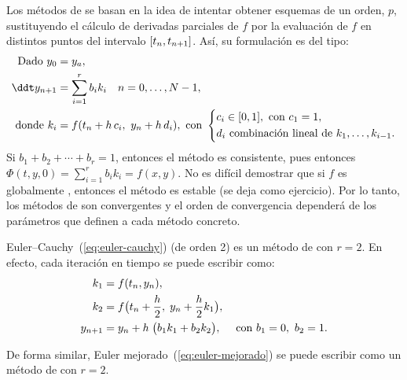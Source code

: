Los métodos de \RK se basan en la idea de intentar obtener
esquemas de un orden, $p$, sustituyendo el cálculo de derivadas
parciales de $f$ por la evaluación de $f$ en distintos puntos del
intervalo $[{t_n},{t_{n+1}}]$. Así, su formulación es del tipo:
\begin{align}
  \notag
  \text{Dado}\ y_0 &= \ycero,\\
  \label{eq:R-K-formula-general}
  \ddt y_{n+1} &= \sum_{i=1}^r b_ik_i\quad
                 n=0,\dots, N-1,
  \\
  \notag
  \text{donde}\ k_i &= f(t_n+h\, c_i,\ y_n + h\, d_{i}), \text{\
                      con }
                      \left\{
                      \begin{aligned}
                        & c_i\in [0,1], \text{ con } c_1=1,
                        \\ &d_{i} \text{ combinación
                          lineal de } k_1,\dots,k_{i-1}.
                      \end{aligned}
                             \right.
\end{align}
Si $b_1+b_2+\cdots+b_r=1$, entonces el método es consistente, pues
entonces $\Phi(t,y,0)=\sum_{i=1}^r b_ik_i=f(x,y)$. No es difícil
demostrar que si $f$ es globalmente \lipschitz, entonces el método es
estable (se deja como ejercicio). Por lo tanto, los métodos de
\RK son convergentes y el orden de convergencia dependerá de
los parámetros que definen a cada método concreto.

\begin{example}
  Euler--Cauchy~(\ref{eq:euler-cauchy}) (de orden 2) es un método de \RK
  con $r=2$. En efecto, cada iteración en tiempo se puede escribir
  como:
  \begin{align*}
    k_1 &= f({t_n},{y_n}), \\ k_2 &= f\big(t_{n}+\frac{h}{2},\; {y_n}+\frac{h}{2}k_1 \big),
    \\
    {y_{n+1}} &= {y_n} + h \; \big( b_1k_1 + b_2 k_2 \big),
           \quad
           \text{ con } b_1=0,\ b_2=1.
  \end{align*}

  De forma similar, Euler mejorado~(\ref{eq:euler-mejorado}) se puede escribir como un método de
  \RK con $r=2$.
\end{example}

